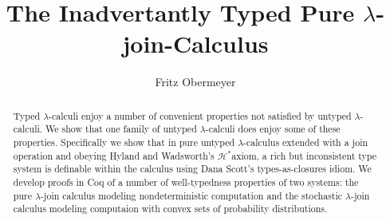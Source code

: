 \documentclass[11pt,a4paper]{article}
\newcommand \Hstar {{\ensuremath{\mathcal H^\ast}}}
\begin{document}
\title{ The Inadvertantly Typed Pure $\lambda$-join-Calculus }
\author{ Fritz Obermeyer }

\maketitle

\begin{abstract}
Typed $\lambda$-calculi enjoy a number of convenient properties not
satisfied by untyped $\lambda$-calculi.
We show that one family of untyped $\lambda$-calculi
does enjoy some of these properties.
Specifically we show that in pure untyped $\lambda$-calculus
extended with a join operation
and obeying Hyland and Wadsworth's \Hstar axiom,
a rich but inconsistent type system is definable within the calculus
using Dana Scott's types-as-closures idiom.
We develop proofs in Coq of a number of well-typedness properties
of two systems:
the pure $\lambda$-join calculus modeling nondeterministic computation
and the stochastic $\lambda$-join calculus modeling computaion with
convex sets of probability distributions.
\end{abstract}

\tableofcontents

\newpage



\printbibliography
\end{document}
